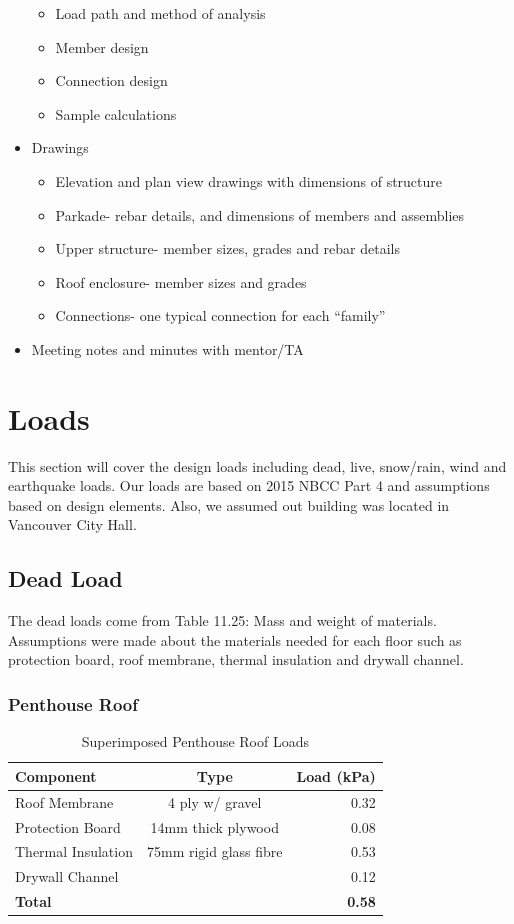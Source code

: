 \documentclass[12pt]{article}
\begin{document}
\begin{itemize}
\begin{itemize}
        \item Load path and method of analysis
        \item Member design
        \item Connection design
        \item Sample calculations
    \end{itemize}
    \item Drawings
    \begin{itemize}
        \item Elevation and plan view drawings with dimensions of structure
        \item Parkade- rebar details, and dimensions of members and assemblies
        \item Upper structure- member sizes, grades and rebar details
        \item Roof enclosure- member sizes and grades
        \item Connections- one typical connection for each “family”
    \end{itemize}
    \item Meeting notes and minutes with mentor/TA
\end{itemize}
\section{Loads}
This section will cover the design loads including dead, live, snow/rain, wind and earthquake loads.
 Our loads are based on 2015 NBCC Part 4 and assumptions based on design elements.
 Also, we assumed out building was located in Vancouver City Hall.
 \subsection{Dead Load}
 The dead loads come from Table 11.25: Mass and weight of materials.
 Assumptions were made about the materials needed for each floor such as protection board, roof membrane, thermal insulation and drywall channel.
\subsubsection{Penthouse Roof}
    \begin{table}[h!]
        \centering
        \caption{Superimposed Penthouse Roof Loads}
        \label{tab:superPent}
    \begin{tabular}{lcr}
        \toprule
        \textbf{Component} & \textbf{Type} & \textbf{Load (kPa)}\\
        \midrule
        Roof Membrane & 4 ply w/ gravel & 0.32\\
        Protection Board & 14mm thick plywood & 0.08\\
        Thermal Insulation & 75mm rigid glass fibre & 0.53\\
        Drywall Channel & & 0.12\\
        \textbf{Total} & & \textbf{0.58}\\
        \bottomrule
    \end{tabular}
    \end{table}
\end{document}
